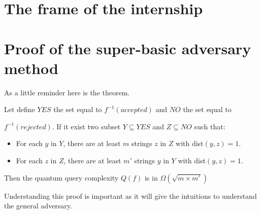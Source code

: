 \begin{appendix}

    \section*{The frame of the internship}


    \section{Proof of the super-basic adversary method}\label{proof:advmethod}
    As a little reminder here is the theorem.
    \begin{theorem}
        Let define $YES$ the set equal to $f^{-1}(accepted)$ and $NO$ the set
        equal to

        $f^{-1}(rejected)$. If it exist two subset $Y\subseteq YES$ and
        $Z \subseteq NO$ such that:
        \begin{itemize}
            \item For each $y$ in $Y$, there are at least $m$ strings $z$ in $Z$ with dist$(y,z)=1$.
            \item For each $z$ in $Z$, there are at least $m'$ strings $y$ in $Y$ with dist$(y,z)=1$.
        \end{itemize}
        Then the quantum query complexity $Q(f)$ is in  $\Omega(\sqrt{m\times m'})$
    \end{theorem}

    Understanding this proof is important as it will give the intuitions to understand the
    general adversary.


\end{appendix}
